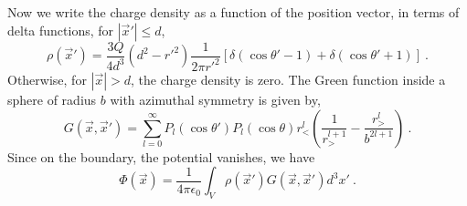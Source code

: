 \documentclass[12pt]{article}
\begin{document}
\newpage
{} %
Now we write the charge density as a function of the position vector, in terms of delta functions, for $|\vec x'| \le d$,
\begin{equation}
    \rho(\vec x') = \frac{3Q}{4d^3}(d^2 - r'^2) \frac{1}{2\pi r'^2} [\delta(\cos \theta' - 1) + \delta(\cos \theta' + 1)]~.
\end{equation}
Otherwise, for $|\vec x| > d$, the charge density is zero.
The Green function inside a sphere of radius $b$ with azimuthal symmetry is given by,
\begin{equation}
    G(\vec x, \vec x') = \sum_{l=0}^\infty P_l(\cos \theta') P_l(\cos \theta) r_<^l \left(\frac{1}{r_>^{l+1}} - \frac{r_>^l}{b^{2l+1}}\right)~.
\end{equation}
Since on the boundary, the potential vanishes, we have
\begin{equation}
    \Phi(\vec x) = \frac{1}{4\pi \epsilon_0} \int_V \rho(\vec x') G(\vec x, \vec x') d^3 x'~.
\end{equation}
\end{document}

